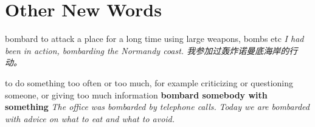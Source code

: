 \chapter{Other New Words}

\begin{DefWord}{bombard}
    to attack a place for a long time using large weapons, bombs etc
    \textit{I had been in action, bombarding the Normandy coast. 我参加过轰炸诺曼底海岸的行动。}

    to do something too often or too much, for example criticizing or questioning someone, or giving too much information
    \textbf{bombard somebody with something}
    \textit{The office was bombarded by telephone calls.}
    \textit{Today we are bombarded with advice on what to eat and what to avoid.}

\end{DefWord}
